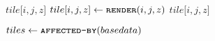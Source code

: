 \documentclass[11pt]{amsart}
\begin{document}
\begin{algorithmic}
    \State \Return $tile \lbrack i, j, z \rbrack$
 \Else
    \State $tile \lbrack i, j, z \rbrack \gets \Call{\texttt{render}}{i,j,z}$
    \State \Return $tile \lbrack i, j, z \rbrack$
\EndIf 
\EndFunction
\end{algorithmic}

\vspace{2ex}

\begin{algorithmic}
    \State $tiles \gets \Call{\texttt{affected-by}}{basedata}$
         \State {}
    \EndFor
    \State {}

\EndFunction
\end{algorithmic}
\end{document}
